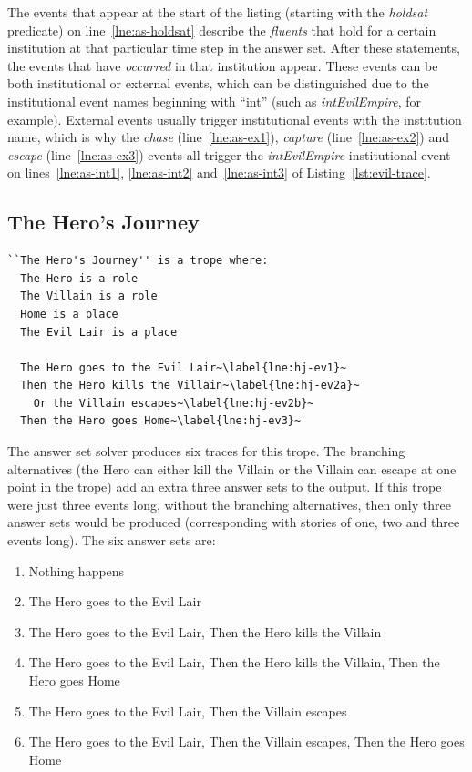 \documentclass[11pt]{report}
\begin{document}
The events that appear at the start of the listing (starting with the
\emph{holdsat} predicate) on line~\ref{lne:as-holdsat} describe the \emph{fluents} that hold for a certain
institution at that particular time step in the answer set. After these
statements, the events that have \emph{occurred} in that institution appear.
These events can be both institutional or external events, which can be
distinguished due to the institutional event names beginning with ``int'' (such
as \emph{intEvilEmpire}, for example). External events usually trigger
institutional events with the institution name, which is why the \emph{chase} (line~\ref{lne:as-ex1}),
\emph{capture} (line~\ref{lne:as-ex2}) and \emph{escape} (line~\ref{lne:as-ex3}) events all trigger the \emph{intEvilEmpire}
institutional event on lines~\ref{lne:as-int1}, \ref{lne:as-int2} and~\ref{lne:as-int3} of Listing~\ref{lst:evil-trace}.

\subsection{The Hero's Journey}

\begin{lstlisting}[showstringspaces=false, escapechar=\~]
``The Hero's Journey'' is a trope where:
  The Hero is a role
  The Villain is a role
  Home is a place
  The Evil Lair is a place

  The Hero goes to the Evil Lair~\label{lne:hj-ev1}~
  Then the Hero kills the Villain~\label{lne:hj-ev2a}~
    Or the Villain escapes~\label{lne:hj-ev2b}~
  Then the Hero goes Home~\label{lne:hj-ev3}~
\end{lstlisting}

The answer set solver produces six traces for this trope. The branching
alternatives (the Hero can either kill the Villain or the Villain can escape at
one point in the trope) add an extra three answer sets to the output. If this
trope were just three events long, without the branching alternatives, then only
three answer sets would be produced (corresponding with stories of one, two
and three events long). The six answer sets are:

\begin{enumerate}
  \item Nothing happens
  \item The Hero goes to the Evil Lair
  \item The Hero goes to the Evil Lair, Then the Hero kills the Villain
  \item The Hero goes to the Evil Lair, Then the Hero kills the Villain, Then
    the Hero goes Home
  \item The Hero goes to the Evil Lair, Then the Villain escapes
  \item The Hero goes to the Evil Lair, Then the Villain escapes, Then the Hero
    goes Home
\end{enumerate}
\end{document}
